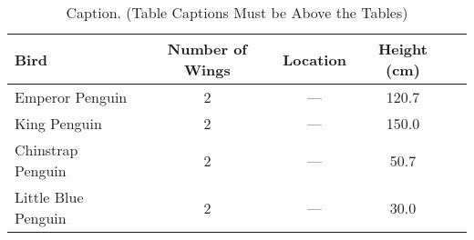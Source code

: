 \begin{table}[!ht]
\centering
\caption{Caption. (Table Captions Must be Above the Tables)}
\setlength\tabcolsep{9pt}
\renewcommand{\arraystretch}{1}
\begin{tabular}{l|c|ccc}
\toprule
\textbf{Bird} & \textbf{Number of Wings} & \textbf{Location} & \textbf{Height (cm)} \\
\midrule

Emperor Penguin & \num{2}  & --- & \num{120.7} \\
King Penguin & \num{2}  & --- & \num{150.0} \\ 
Chinstrap Penguin & \num{2}  & --- & \num{50.7} \\ 
Little Blue Penguin & \num{2}  & --- & \num{30.0} \\ 

\bottomrule
\end{tabular}
\label{tab:example_pinguins}
\end{table}